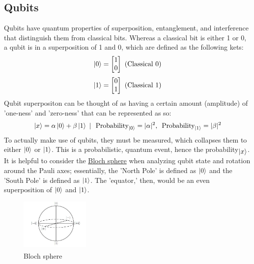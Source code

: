 \documentclass[12pt]{article}
\begin{document}
\subsection{Qubits}
Qubits have quantum properties of superposition, entanglement, and interference that distinguish them from classical bits. Whereas a classical bit is either 1 or 0, a qubit is in a superposition of 1 and 0, which are defined as the following kets:
$$ \ket{0} = \begin{bmatrix} 1 \\ 0 \end{bmatrix} \text{ (Classical 0)} $$
$$ \ket{1} = \begin{bmatrix} 0 \\ 1 \end{bmatrix} \text{ (Classical 1)} $$
Qubit superpositon can be thought of as having a certain amount (amplitude) of 'one-ness' and 'zero-ness' that can be represented as so:
$$ \ket{x} = \alpha \ket{0} + \beta \ket{1} \ | \ \text{ Probability}_{\ket{0}} = | \alpha |^2 \text{, } \text{ Probability}_{\ket{1}} = | \beta |^2 $$
To actually make use of qubits, they must be measured, which collapses them to either $\ket{0}$ or $\ket{1}$. This is a probabilistic, quantum event, hence the probability\textsubscript{$\ket{x}$}. It is helpful to consider the \hyperref[fig:bsphere]{Bloch sphere} when analyzing qubit state and rotation around the Pauli axes; essentially, the 'North Pole' is defined as $\ket{0}$ and the 'South Pole' is defined as $\ket{1}$. The 'equator,' then, would be an even superposition of $\ket{0}$ and $\ket{1}$.

\begin{figure}[H]
    \centering
    \capstart
    \includegraphics[width=0.3\textwidth]{images/bloch_sphere.png}
    \caption{Bloch sphere\textsuperscript{\cite{wikipedia_2021}}}
    \label{fig:bsphere}
\end{figure}
\end{document}
